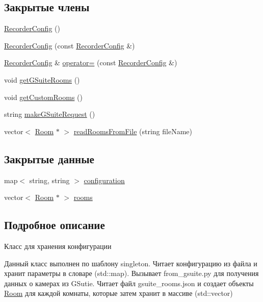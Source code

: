 \subsection*{Закрытые члены}
\begin{DoxyCompactItemize}
\item 
\hyperlink{class_recorder_config_a39ca563c2ac944a725b6d627ff364ab9}{Recorder\+Config} ()
\item 
\hyperlink{class_recorder_config_a8393f87b954754d668f43957399999e5}{Recorder\+Config} (const \hyperlink{class_recorder_config}{Recorder\+Config} \&)
\item 
\hyperlink{class_recorder_config}{Recorder\+Config} \& \hyperlink{class_recorder_config_a49c641cf388b7fcf54711cd2f9f52a1d}{operator=} (const \hyperlink{class_recorder_config}{Recorder\+Config} \&)
\item 
void \hyperlink{class_recorder_config_ae74d1af712e9684786ed33f67a8eeda3}{get\+G\+Suite\+Rooms} ()
\item 
void \hyperlink{class_recorder_config_a1a24b616ff9ca5beac0bb37210da9ef1}{get\+Custom\+Rooms} ()
\item 
string \hyperlink{class_recorder_config_abdba11995310d688ddeee1227de67cda}{make\+G\+Suite\+Request} ()
\item 
vector$<$ \hyperlink{class_room}{Room} $\ast$ $>$ \hyperlink{class_recorder_config_aa2d44f3749c087805183a62b013fa1ff}{read\+Rooms\+From\+File} (string file\+Name)
\end{DoxyCompactItemize}
\subsection*{Закрытые данные}
\begin{DoxyCompactItemize}
\item 
map$<$ string, string $>$ \hyperlink{class_recorder_config_a4b5b3bcc77e7477f36d5a4dec2a0ac82}{configuration}
\item 
vector$<$ \hyperlink{class_room}{Room} $\ast$ $>$ \hyperlink{class_recorder_config_ac04e6a613601514d26353c38bbcc9804}{rooms}
\end{DoxyCompactItemize}


\subsection{Подробное описание}
Класс для хранения конфигурации 

Данный класс выполнен по шаблону singleton. Читает конфигурацию из файла и хранит параметры в словаре (std\+::map). Вызывает from\+\_\+gsuite.\+py для получения данных о камерах из G\+Sutie. Читает файл gsuite\+\_\+rooms.\+json и создает объекты \hyperlink{class_room}{Room} для каждой комнаты, которые затем хранит в массиве (std\+::vector)

